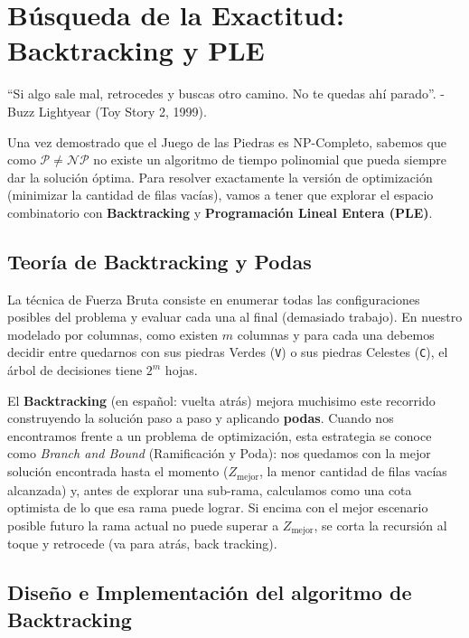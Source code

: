 \section{Búsqueda de la Exactitud: Backtracking y PLE}
``Si algo sale mal, retrocedes y buscas otro camino. No te quedas ahí parado''. - Buzz Lightyear (Toy Story 2, 1999).

Una vez demostrado que el Juego de las Piedras es NP-Completo, sabemos que como $\mathcal{P} \neq \mathcal{NP}$ no existe un algoritmo de tiempo polinomial que pueda siempre dar la solución óptima. Para resolver exactamente la versión de optimización (minimizar la cantidad de filas vacías), vamos a tener que explorar el espacio combinatorio con \textbf{Backtracking} y \textbf{Programación Lineal Entera (PLE)}.

\subsection{Teoría de Backtracking y Podas}

La técnica de Fuerza Bruta consiste en enumerar todas las configuraciones posibles del problema y evaluar cada una al final (demasiado trabajo). En nuestro modelado por columnas, como existen $m$ columnas y para cada una debemos decidir entre quedarnos con sus piedras Verdes (\texttt{V}) o sus piedras Celestes (\texttt{C}), el árbol de decisiones tiene $2^m$ hojas.

El \textbf{Backtracking} (en español: vuelta atrás) mejora muchisimo este recorrido construyendo la solución paso a paso y aplicando \textbf{podas}. Cuando nos encontramos frente a un problema de optimización, esta estrategia se conoce como \textit{Branch and Bound} (Ramificación y Poda): nos quedamos con la mejor solución encontrada hasta el momento ($Z_{\text{mejor}}$, la menor cantidad de filas vacías alcanzada) y, antes de explorar una sub-rama, calculamos como una cota optimista de lo que esa rama puede lograr. Si encima con el mejor escenario posible futuro la rama actual no puede superar a $Z_{\text{mejor}}$, se corta la recursión al toque y retrocede (va para atrás, back tracking).

\subsection{Diseño e Implementación del algoritmo de Backtracking}

